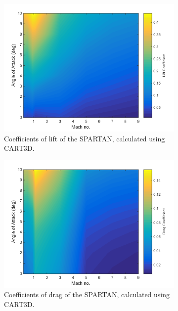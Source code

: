 \begin{figure}
	\begin{subfigure}{.5\textwidth}
\centering
\includegraphics[width=0.99\linewidth]{figures/3_vehicle_design/Cl}
\caption{Coefficients of lift of the SPARTAN, calculated using CART3D.}
\label{fig:Cl}
\end{subfigure}
\begin{subfigure}{.5\textwidth}
\centering
\includegraphics[width=0.99\linewidth]{figures/3_vehicle_design/Cd}
\caption{Coefficients of drag of the SPARTAN, calculated using CART3D.}
\label{fig:Cd}
\end{subfigure}
\begin{subfigure}{.5\textwidth}
\centering

\end{subfigure}
\end{figure}
